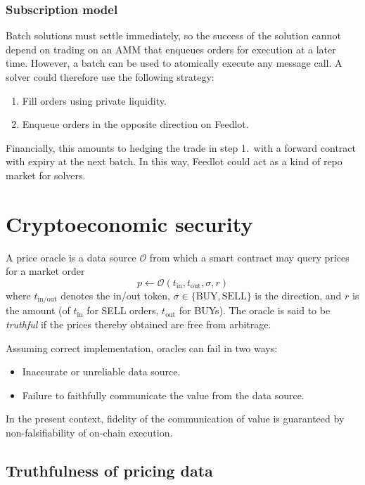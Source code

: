 \documentclass[a4paper,10pt]{article}
\theoremstyle{remark}
\newcommand \oracle {\mathcal{O}}
\begin{document}
\subsubsection{Subscription model}

Batch solutions must settle immediately, so the success of the solution cannot depend on trading on an AMM that enqueues orders for execution at a later time.
%
However, a batch can be used to atomically execute any message call.
%
A solver could therefore use the following strategy:
\begin{enumerate}
  \item Fill orders using private liquidity.
  \item Enqueue orders in the opposite direction on Feedlot.
\end{enumerate}
Financially, this amounts to hedging the trade in step 1.~with a forward contract with expiry at the next batch.
%
In this way, Feedlot could act as a kind of repo market for solvers.

\section{Cryptoeconomic security}
\label{security}

A price oracle is a data source $\oracle$ from which a smart contract may query prices for a market order 
\[
  p \leftarrow \oracle (t_\mathrm{in},t_\mathrm{out},\sigma,r)
\]
where $t_\mathrm{in/out}$ denotes the in/out token, $\sigma\in\{\mathrm{BUY},\mathrm{SELL}\}$ is the direction, and $r$ is the amount (of $t_\mathrm{in}$ for SELL orders, $t_\mathrm{out}$ for BUYs).
%
The oracle is said to be \emph{truthful} if the prices thereby obtained are free from arbitrage.

Assuming correct implementation, oracles can fail in two ways:
\begin{itemize}
  \item Inaccurate or unreliable data source.
  \item Failure to faithfully communicate the value from the data source.
\end{itemize}
In the present context, fidelity of the communication of value is guaranteed by non-falsifiability of on-chain execution.

\subsection{Truthfulness of pricing data}
\label{realisable}
\end{document}
